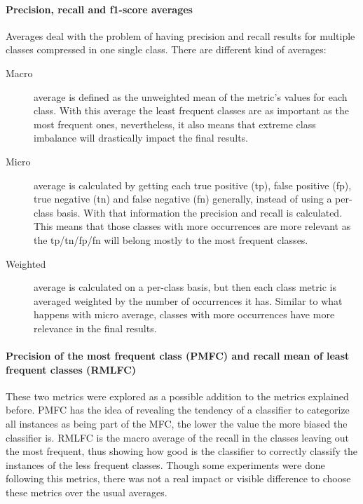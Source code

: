 \paragraph{Precision, recall and f1-score averages} Averages deal with the
problem of having precision and recall results for multiple classes compressed
in one single class. There are different kind of averages:

\begin{description}
  \item[Macro~\cite{Manning:2008:IIR:1394399}] average is defined as the
    unweighted mean of the metric's values for each class. With this average
    the least frequent classes are as important as the most frequent ones,
    nevertheless, it also means that extreme class imbalance will drastically
    impact the final results.
  \item[Micro~\cite{Manning:2008:IIR:1394399}] average is calculated by getting
    each true positive (tp), false positive (fp), true negative (tn) and false
    negative (fn) generally, instead of using a per-class basis. With that
    information the precision and recall is calculated. This means that those
    classes with more occurrences are more relevant as the tp/tn/fp/fn will
    belong mostly to the most frequent classes.
  \item[Weighted] average is calculated on a per-class basis, but then each
    class metric is averaged weighted by the number of occurrences it has.
    Similar to what happens with micro average, classes with more occurrences
    have more relevance in the final results.
\end{description}

\paragraph{Precision of the most frequent class (PMFC) and recall mean of least
frequent classes (RMLFC)} These two metrics were explored as a possible
addition to the metrics explained before. PMFC has the idea of revealing the
tendency of a classifier to categorize all instances as being part of the MFC,
the lower the value the more biased the classifier is. RMLFC is the macro
average of the recall in the classes leaving out the most frequent, thus
showing how good is the classifier to correctly classify the instances of the
less frequent classes. Though some experiments were done following this
metrics, there was not a real impact or visible difference to choose these
metrics over the usual averages.


